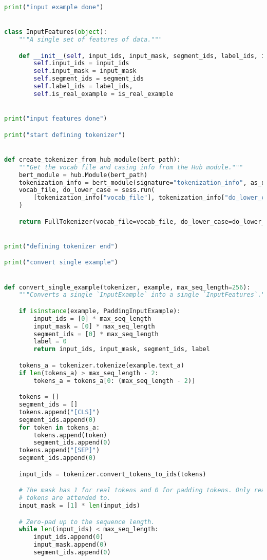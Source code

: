 \begin{lstlisting}[language=Python, caption=My attempt to adapt BERT to short text classification]
print("input example done")


class InputFeatures(object):
    """A single set of features of data."""

    def __init__(self, input_ids, input_mask, segment_ids, label_ids, is_real_example=True):
        self.input_ids = input_ids
        self.input_mask = input_mask
        self.segment_ids = segment_ids
        self.label_ids = label_ids,
        self.is_real_example = is_real_example


print("input features done")

print("start defining tokenizer")


def create_tokenizer_from_hub_module(bert_path):
    """Get the vocab file and casing info from the Hub module."""
    bert_module = hub.Module(bert_path)
    tokenization_info = bert_module(signature="tokenization_info", as_dict=True)
    vocab_file, do_lower_case = sess.run(
        [tokenization_info["vocab_file"], tokenization_info["do_lower_case"]]
    )

    return FullTokenizer(vocab_file=vocab_file, do_lower_case=do_lower_case)


print("defining tokenizer end")

print("convert single example")


def convert_single_example(tokenizer, example, max_seq_length=256):
    """Converts a single `InputExample` into a single `InputFeatures`."""

    if isinstance(example, PaddingInputExample):
        input_ids = [0] * max_seq_length
        input_mask = [0] * max_seq_length
        segment_ids = [0] * max_seq_length
        label = 0
        return input_ids, input_mask, segment_ids, label

    tokens_a = tokenizer.tokenize(example.text_a)
    if len(tokens_a) > max_seq_length - 2:
        tokens_a = tokens_a[0: (max_seq_length - 2)]

    tokens = []
    segment_ids = []
    tokens.append("[CLS]")
    segment_ids.append(0)
    for token in tokens_a:
        tokens.append(token)
        segment_ids.append(0)
    tokens.append("[SEP]")
    segment_ids.append(0)

    input_ids = tokenizer.convert_tokens_to_ids(tokens)

    # The mask has 1 for real tokens and 0 for padding tokens. Only real
    # tokens are attended to.
    input_mask = [1] * len(input_ids)

    # Zero-pad up to the sequence length.
    while len(input_ids) < max_seq_length:
        input_ids.append(0)
        input_mask.append(0)
        segment_ids.append(0)


\end{lstlisting}
